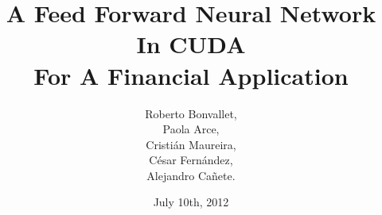 \documentclass{beamer}
\author{\large
  Roberto Bonvallet,\\
  Paola Arce,\\
  Cristián Maureira,\\
  César Fernández,\\
  Alejandro Cañete.
}
\title{\Large 
  A Feed Forward Neural Network In CUDA\\ For A Financial Application
}
\date{July 10th, 2012}
\begin{document}
\begin{frame}[t,plain]
\titlepage
\end{frame}
%
\begin{frame}[t,plain]
\titlepage
\end{frame}
\end{document}
